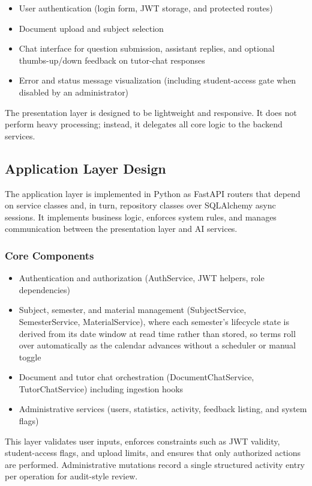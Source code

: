 \documentclass[12pt, a4paper, oneside]{report}
\let\oldsubsection\subsection
\renewcommand{\subsection}{%
  \addtocontents{toc}{\protect\needspace{3\baselineskip}}%
  \oldsubsection
}
\begin{document}
\begin{itemize}
  \item User authentication (login form, JWT storage, and protected routes)
  \item Document upload and subject selection
  \item Chat interface for question submission, assistant replies, and optional thumbs-up/down feedback on tutor-chat responses
  \item Error and status message visualization (including student-access gate when disabled by an administrator)
\end{itemize}

The presentation layer is designed to be lightweight and responsive. It does not perform heavy processing; instead, it delegates all core logic to the backend services.
\newpage
\subsection{Application Layer Design}

The application layer is implemented in Python as FastAPI routers that depend on service classes and, in turn, repository classes over SQLAlchemy async sessions. It implements business logic, enforces system rules, and manages communication between the presentation layer and AI services.

\subsubsection{Core Components}

\begin{itemize}
  \item Authentication and authorization (AuthService, JWT helpers, role dependencies)
  \item Subject, semester, and material management (SubjectService, SemesterService, MaterialService), where each semester's lifecycle state is derived from its date window at read time rather than stored, so terms roll over automatically as the calendar advances without a scheduler or manual toggle
  \item Document and tutor chat orchestration (DocumentChatService, TutorChatService) including ingestion hooks
  \item Administrative services (users, statistics, activity, feedback listing, and system flags)
\end{itemize}

This layer validates user inputs, enforces constraints such as JWT validity, student-access flags, and upload limits, and ensures that only authorized actions are performed. Administrative mutations record a single structured activity entry per operation for audit-style review.
\end{document}
